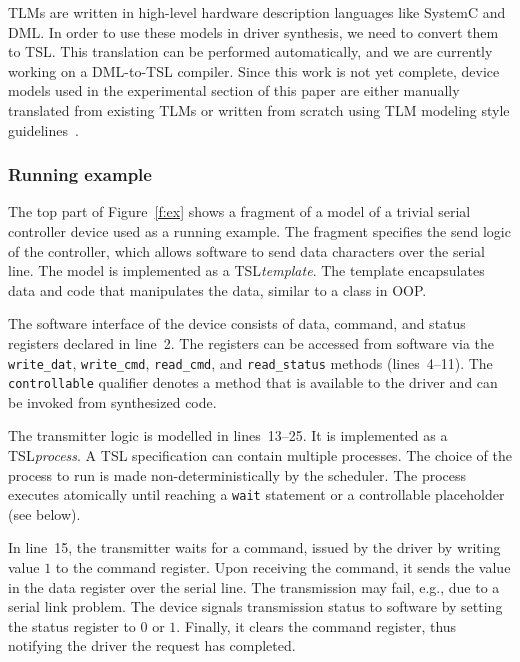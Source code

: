 \documentclass[a4paper,twoside,openright,11pt]{book}
\newcommand{\tsl}{TSL\xspace}
\theoremstyle{definition}
\newcommand{\src}[1]{\texttt{\small #1}}
\begin{document}
TLMs are written in high-level hardware description languages like SystemC and DML.  In order to use these models in driver synthesis, we need to convert them to \tsl.  This translation can be performed automatically, and we are currently working on a DML-to-\tsl compiler.  Since this work is not yet complete, device models used in the experimental section of this paper are either manually translated from existing TLMs or written from scratch using TLM modeling style guidelines~\cite{dml_ug}.


\subsubsection{Running example}

The top part of Figure~\ref{f:ex} shows a fragment of a model of a trivial serial controller device used as a running example.  The fragment specifies the send logic of the controller, which allows software to send data characters over the serial line.  The model is implemented as a \tsl \emph{template}.  The template encapsulates data and code that manipulates the data, similar to a class in OOP.

The software interface of the device consists of data, command, and status registers declared in line~2.  The registers can be accessed from software via the \src{write\_dat}, \src{write\_cmd}, \src{read\_cmd}, and \src{read\_status} methods (lines~4--11).  The \src{controllable} qualifier denotes a method that is available to the driver and can be invoked from synthesized code.

The transmitter logic is modelled in lines~13--25.  It is implemented as a \tsl \emph{process}.  A \tsl specification can contain multiple processes.  The choice of the process to run is made non-deterministically by the scheduler.  The process executes atomically until reaching a \src{wait} statement or a controllable placeholder (see below).

In line~15, the transmitter waits for a command, issued by the driver by writing value $1$ to the command register.  Upon receiving the command, it sends the value in the data register over the serial line.  The transmission may fail, e.g., due to a serial link problem.  The device signals transmission status to software by setting the status register to $0$ or $1$.  Finally, it clears the command register, thus notifying the driver the request has completed.
\end{document}
